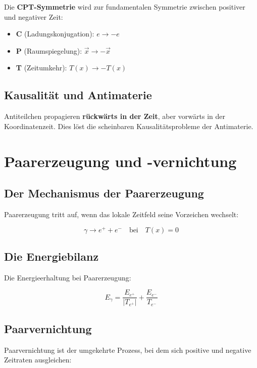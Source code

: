 \documentclass[12pt,a4paper]{report}
\begin{document}
Die \textbf{CPT-Symmetrie} wird zur fundamentalen Symmetrie zwischen positiver und negativer Zeit:

\begin{itemize}
	\item \textbf{C} (Ladungskonjugation): $e \to -e$
	\item \textbf{P} (Raumspiegelung): $\vec{x} \to -\vec{x}$
	\item \textbf{T} (Zeitumkehr): $T(x) \to -T(x)$
\end{itemize}

\subsection{Kausalität und Antimaterie}

Antiteilchen propagieren \textbf{rückwärts in der Zeit}, aber vorwärts in der Koordinatenzeit. Dies löst die scheinbaren Kausalitätsprobleme der Antimaterie.

\section{Paarerzeugung und -vernichtung}

\subsection{Der Mechanismus der Paarerzeugung}

Paarerzeugung tritt auf, wenn das lokale Zeitfeld seine Vorzeichen wechselt:

\begin{equation}
	\gamma \to e^+ + e^- \quad \text{bei} \quad T(x) = 0
\end{equation}

\subsection{Die Energiebilanz}

Die Energieerhaltung bei Paarerzeugung:

\begin{equation}
	E_\gamma = \frac{E_{e^+}}{|T_{e^+}|} + \frac{E_{e^-}}{T_{e^-}}
\end{equation}

\subsection{Paarvernichtung}

Paarvernichtung ist der umgekehrte Prozess, bei dem sich positive und negative Zeitraten ausgleichen:
\end{document}

